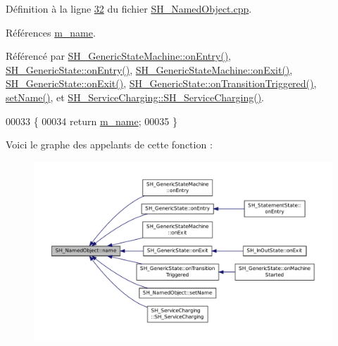 Définition à la ligne \hyperlink{SH__NamedObject_8cpp_source_l00032}{32} du fichier \hyperlink{SH__NamedObject_8cpp_source}{S\-H\-\_\-\-Named\-Object.\-cpp}.



Références \hyperlink{classSH__NamedObject_a7f8e3346256986c337a792339ea5a015}{m\-\_\-name}.



Référencé par \hyperlink{classSH__GenericStateMachine_adfd82f2532595ed7c4bcf21f03cbb951}{S\-H\-\_\-\-Generic\-State\-Machine\-::on\-Entry()}, \hyperlink{classSH__GenericState_a68c67ef95738e01cd34cd5926f4932fb}{S\-H\-\_\-\-Generic\-State\-::on\-Entry()}, \hyperlink{classSH__GenericStateMachine_a4b36d60fa1876908493d3d07f191a30f}{S\-H\-\_\-\-Generic\-State\-Machine\-::on\-Exit()}, \hyperlink{classSH__GenericState_a7f7863859318c70c9b734be5bf5510b0}{S\-H\-\_\-\-Generic\-State\-::on\-Exit()}, \hyperlink{classSH__GenericState_aad4259cc1e6a51681d6a92e995486380}{S\-H\-\_\-\-Generic\-State\-::on\-Transition\-Triggered()}, \hyperlink{classSH__NamedObject_a6bc164e6fa10ae190770529af75d1775}{set\-Name()}, et \hyperlink{classSH__ServiceCharging_afa5273d046049b1c2b020a6a19a8290b}{S\-H\-\_\-\-Service\-Charging\-::\-S\-H\-\_\-\-Service\-Charging()}.


\begin{DoxyCode}
00033 \{
00034     \textcolor{keywordflow}{return} \hyperlink{classSH__NamedObject_a7f8e3346256986c337a792339ea5a015}{m\_name};
00035 \}
\end{DoxyCode}


Voici le graphe des appelants de cette fonction \-:\nopagebreak
\begin{figure}[H]
\begin{center}
\leavevmode
\includegraphics[width=350pt]{classSH__NamedObject_a9f686c6f2a5bcc08ad03d0cee0151f0f_icgraph}
\end{center}
\end{figure}


